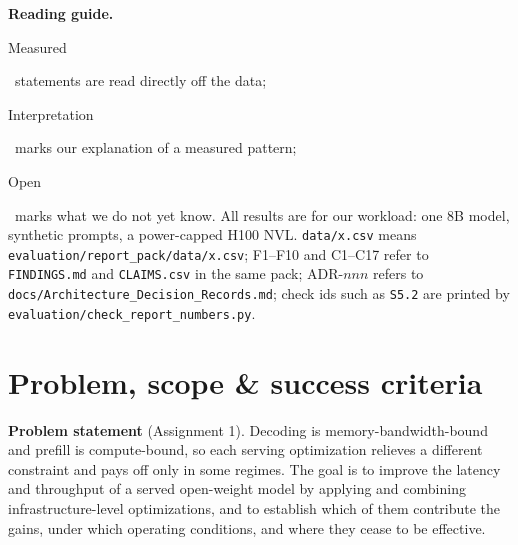 \documentclass[10pt,a4paper]{article}
\newcommand{\tagbox}[2]{\colorbox{#1}{\ttfamily\scriptsize\bfseries\color{ink}\strut #2}}
\newcommand{\meas}{\tagbox{measbg}{Measured}~}
\newcommand{\interp}{\tagbox{interpbg}{Interpretation}~}
\newcommand{\open}{\tagbox{openbg}{Open}~}
\newcommand{\fp}[1]{{\leavevmode\urlstyle{tt}\color{codecol}\nolinkurl{#1}}}
\begin{document}
\begin{guidebox}
\small
\textbf{Reading guide.} \meas statements are read directly off the data; \interp marks our explanation of
a measured pattern; \open marks what we do not yet know. All results are for our workload: one 8B model, synthetic
prompts, a power-capped H100 NVL. \fp{data/x.csv} means \fp{evaluation/report_pack/data/x.csv}; F1--F10 and C1--C17
refer to \fp{FINDINGS.md} and \fp{CLAIMS.csv} in the same pack; ADR-$nnn$ refers to
\fp{docs/Architecture_Decision_Records.md}; check ids such as \texttt{S5.2} are printed by
\fp{evaluation/check_report_numbers.py}.
\end{guidebox}

\section{Problem, scope \& success criteria}
\textbf{Problem statement} (Assignment 1). Decoding is memory-bandwidth-bound and prefill is compute-bound, so each
serving optimization relieves a different constraint and pays off only in some regimes. The goal is to improve the
latency and throughput of a served open-weight model by applying and combining infrastructure-level optimizations,
and to establish which of them contribute the gains, under which operating conditions, and where they cease to be
effective.
\end{document}
